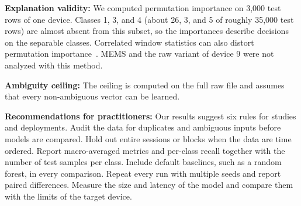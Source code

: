 \textbf{Explanation validity:} We computed permutation importance on 3,000 test rows of one device. Classes 1, 3, and 4 (about 26, 3, and 5 of roughly 35,000 test rows) are almost absent from this subset, so the importances describe decisions on the separable classes. Correlated window statistics can also distort permutation importance~\cite{strobl2008}. MEMS and the raw variant of device 9 were not analyzed with this method.

\textbf{Ambiguity ceiling:} The ceiling is computed on the full raw file and assumes that every non-ambiguous vector can be learned.

\textbf{Recommendations for practitioners:} Our results suggest six rules for studies and deployments. Audit the data for duplicates and ambiguous inputs before models are compared. Hold out entire sessions or blocks when the data are time ordered. Report macro-averaged metrics and per-class recall together with the number of test samples per class. Include default baselines, such as a random forest, in every comparison. Repeat every run with multiple seeds and report paired differences. Measure the size and latency of the model and compare them with the limits of the target device.
